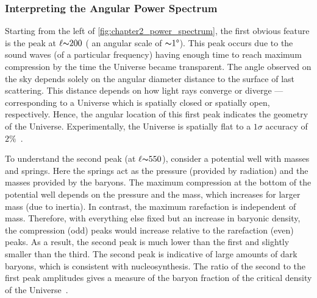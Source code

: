

\subsubsection{Interpreting the Angular Power Spectrum}

Starting from the left of \cref{fig:chapter2_power_spectrum}, the first obvious feature is the peak at \(\ell {\thicksim}\num{200}\) (\ie{} an angular scale of \({\thicksim}\num{1}\degree{}\)).
This peak occurs due to the sound waves (of a particular frequency) having enough time to reach maximum compression by the time the Universe became transparent.
The angle observed on the sky depends solely on the angular diameter distance to the surface of last scattering.
This distance depends on how light rays converge or diverge --- corresponding to a Universe which is spatially closed or spatially open, respectively.
Hence, the angular location of this first peak indicates the geometry of the Universe.
Experimentally, the Universe is spatially flat to a \(1\sigma{}\) accuracy of \(2\%\)~\cite{Planck2020b}. %

To understand the second peak (at \(\ell{} {\thicksim}\num{550}\)), consider a potential well with masses and springs.
Here the springs act as the pressure (provided by radiation) and the masses provided by the baryons.
The maximum compression at the bottom of the potential well depends on the pressure and the mass, which increases for larger mass (due to inertia).
In contrast, the maximum rarefaction is independent of mass.
Therefore, with everything else fixed but an increase in baryonic density, the compression (odd) peaks would increase relative to the rarefaction (even) peaks.
As a result, the second peak is much lower than the first and slightly smaller than the third.
The second peak is indicative of large amounts of dark baryons, which is consistent with nucleosynthesis.
The ratio of the second to the first peak amplitudes gives a measure of the baryon fraction of the critical density of the Universe~\cite{Hu2001}.


